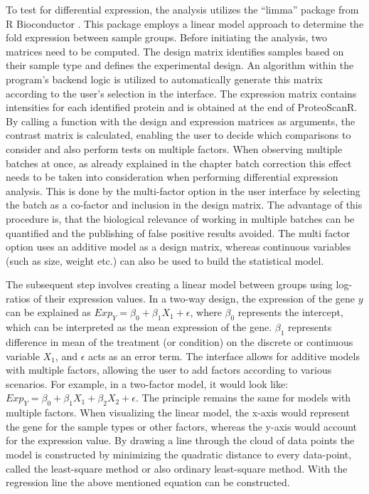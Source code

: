 \documentclass[
  11pt,
]{article}
\begin{document}
To test for differential expression, the analysis utilizes the ``limma''
package from R Bioconductor \citep{Phipson2016}. This package employs a
linear model approach to determine the fold expression between sample
groups. Before initiating the analysis, two matrices need to be
computed. The design matrix identifies samples based on their sample
type and defines the experimental design. An algorithm within the
program's backend logic is utilized to automatically generate this
matrix according to the user's selection in the interface. The
expression matrix contains intensities for each identified protein and
is obtained at the end of ProteoScanR. By calling a function with the
design and expression matrices as arguments, the contrast matrix is
calculated, enabling the user to decide which comparisons to consider
and also perform tests on multiple factors. When observing multiple
batches at once, as already explained in the chapter batch correction
this effect needs to be taken into consideration when performing
differential expression analysis. This is done by the multi-factor
option in the user interface by selecting the batch as a co-factor and
inclusion in the design matrix. The advantage of this procedure is, that
the biological relevance of working in multiple batches can be
quantified and the publishing of false positive results avoided. The
multi factor option uses an additive model as a design matrix, whereas
continuous variables (such as size, weight etc.) can also be used to
build the statistical model.

The subsequent step involves creating a linear model between groups
using log-ratios of their expression values. In a two-way design, the
expression of the gene \(y\) can be explained as
\(Exp_{Y} = \beta_{0} + \beta_{1}X_{1} + \epsilon\), where \(\beta_0\)
represents the intercept, which can be interpreted as the mean
expression of the gene. \(\beta_1\) represents difference in mean of the
treatment (or condition) on the discrete or continuous variable
\(X_{1}\), and \(\epsilon\) acts as an error term. The interface allows
for additive models with multiple factors, allowing the user to add
factors according to various scenarios. For example, in a two-factor
model, it would look like:
\(Exp_{Y} = \beta_{0} + \beta_{1}X_{1} + \beta_{2}X_{2} + \epsilon\).
The principle remains the same for models with multiple factors. When
visualizing the linear model, the x-axis would represent the gene for
the sample types or other factors, whereas the y-axis would account for
the expression value. By drawing a line through the cloud of data points
the model is constructed by minimizing the quadratic distance to every
data-point, called the least-square method or also ordinary least-square
method. With the regression line the above mentioned equation can be
constructed.
\end{document}
